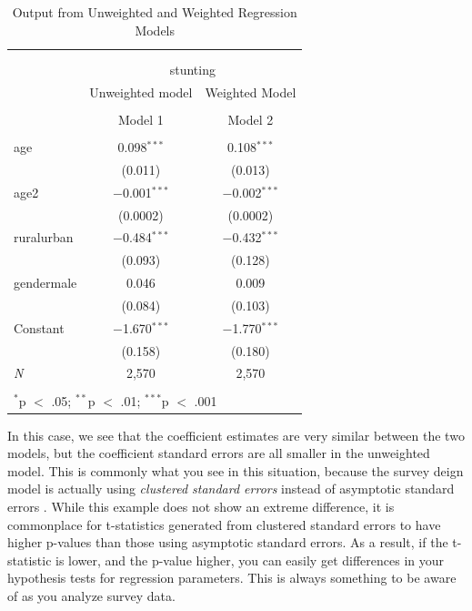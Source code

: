 \documentclass[
]{article}
\begin{document}
\begin{table}[!htbp] \centering 
  \caption{Output from Unweighted and Weighted Regression Models} 
  \label{} 
\begin{tabular}{@{\extracolsep{5pt}}lcc} 
\\[-1.8ex]\hline \\[-1.8ex] 
\\[-1.8ex] & \multicolumn{2}{c}{stunting} \\ 
 & Unweighted model & Weighted Model \\ 
\\[-1.8ex] & Model 1 & Model 2\\ 
\hline \\[-1.8ex] 
 age & 0.098$^{***}$ & 0.108$^{***}$ \\ 
  & (0.011) & (0.013) \\ 
  age2 & $-$0.001$^{***}$ & $-$0.002$^{***}$ \\ 
  & (0.0002) & (0.0002) \\ 
  ruralurban & $-$0.484$^{***}$ & $-$0.432$^{***}$ \\ 
  & (0.093) & (0.128) \\ 
  gendermale & 0.046 & 0.009 \\ 
  & (0.084) & (0.103) \\ 
  Constant & $-$1.670$^{***}$ & $-$1.770$^{***}$ \\ 
  & (0.158) & (0.180) \\ 
 \textit{N} & 2,570 & 2,570 \\ 
\hline \\[-1.8ex] 
\multicolumn{3}{l}{$^{*}$p $<$ .05; $^{**}$p $<$ .01; $^{***}$p $<$ .001} \\ 
\end{tabular} 
\end{table}

In this case, we see that the coefficient estimates are very similar between the two models, but the coefficient standard errors are all smaller in the unweighted model. This is commonly what you see in this situation, because the survey deign model is actually using \emph{clustered standard errors} instead of asymptotic standard errors \citep[\citet{ibragimov_inference_2016}]{cameron_practitioners_2015}. While this example does not show an extreme difference, it is commonplace for t-statistics generated from clustered standard errors to have higher p-values than those using asymptotic standard errors. As a result, if the t-statistic is lower, and the p-value higher, you can easily get differences in your hypothesis tests for regression parameters. This is always something to be aware of as you analyze survey data.
\end{document}
